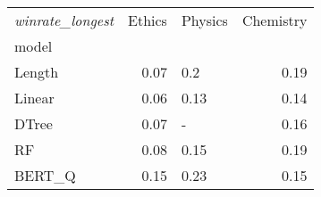 \begin{tabular}{lrlr}
\toprule
\textit{winrate\_longest} &  Ethics & Physics &  Chemistry \\
model  &         &         &            \\
\midrule
Length &    0.07 &     0.2 &       0.19 \\
Linear &    0.06 &    0.13 &       0.14 \\
DTree  &    0.07 &       - &       0.16 \\
RF     &    0.08 &    0.15 &       0.19 \\
BERT\_Q &    0.15 &    0.23 &       0.15 \\
\bottomrule
\end{tabular}
